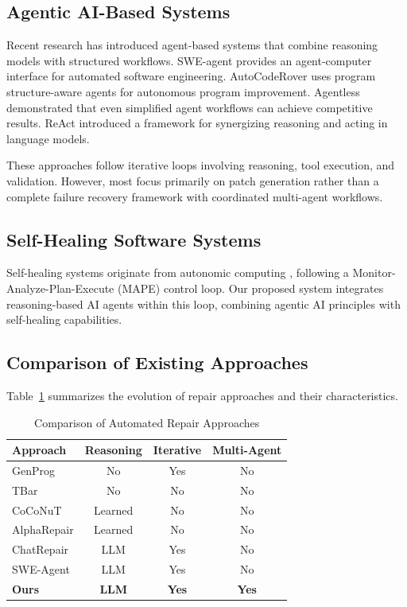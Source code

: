 \documentclass[conference]{IEEEtran}
\begin{document}
\subsection{Agentic AI-Based Systems}
Recent research has introduced agent-based systems that combine reasoning models with structured workflows. SWE-agent \cite{swebenchagent} provides an agent-computer interface for automated software engineering. AutoCodeRover \cite{autocoderover} uses program structure-aware agents for autonomous program improvement. Agentless \cite{agentless} demonstrated that even simplified agent workflows can achieve competitive results. ReAct \cite{react} introduced a framework for synergizing reasoning and acting in language models.

These approaches follow iterative loops involving reasoning, tool execution, and validation. However, most focus primarily on patch generation rather than a complete failure recovery framework with coordinated multi-agent workflows.

\subsection{Self-Healing Software Systems}
Self-healing systems originate from autonomic computing \cite{autonomic}, following a Monitor-Analyze-Plan-Execute (MAPE) control loop. Our proposed system integrates reasoning-based AI agents within this loop, combining agentic AI principles with self-healing capabilities.

\subsection{Comparison of Existing Approaches}
Table~\ref{tab:litcomparison} summarizes the evolution of repair approaches and their characteristics.

\begin{table}[htbp]
\caption{Comparison of Automated Repair Approaches}
\label{tab:litcomparison}
\centering
\small
\begin{tabular}{lccc}
\toprule
\textbf{Approach} & \textbf{Reasoning} & \textbf{Iterative} & \textbf{Multi-Agent} \\
\midrule
GenProg \cite{genprog} & No & Yes & No \\
TBar \cite{templateapr} & No & No & No \\
CoCoNuT \cite{coconut} & Learned & No & No \\
AlphaRepair \cite{alpharepair} & Learned & No & No \\
ChatRepair \cite{chatrepair} & LLM & Yes & No \\
SWE-Agent \cite{swebenchagent} & LLM & Yes & No \\
\textbf{Ours} & \textbf{LLM} & \textbf{Yes} & \textbf{Yes} \\
\bottomrule
\end{tabular}
\end{table}
\end{document}
